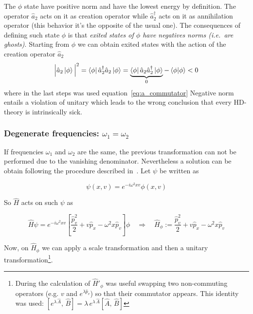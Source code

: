The $\phi$ state have positive norm and have the lowest energy by definition.
The operator $\hat{a}_2$ acts on it as creation operator while
$\hat{a}_2^{\dagger}$ acts on it as annihilation operator (this behavior it's
the opposite of the usual one). The consequences of defining such state $\phi$
is that \emph{exited states of $\phi$ have negatives norms (i.e.\ are ghosts)}.
Starting from $\phi$ we can obtain exited states with the action of the creation
operator $\hat{a}_2$
\begin{equation*}
  {\Big| \hat{a}_2 \ket{\phi} \Big|}^2 =
  \bra{\phi} \hat{a}_2^{\dagger} \hat{a}_2 \ket{\phi} =
  \underbrace{
    \bra{\phi} \hat{a}_2 \hat{a}_2^{\dagger} \ket{\phi}
  }_{0} - \bra{\phi} \ket{\phi} < 0
\end{equation*}
where in the last steps was used equation~\eqref{eq:a_commutator}
Negative norm entails a violation of unitary which
leads to the wrong conclusion that every HD-theory is intrinsically sick.

\subsubsection{Degenerate frequencies: $\omega_1 = \omega_2$}
If frequencies $\omega_1$ and $\omega_2$ are the same, the previous
transformation can not be performed due to the vanishing denominator.
Nevertheless a solution can be obtain following the procedure described
in~\cite{PU50, Bolonek06}. Let $\psi$ be written as

\begin{equation*}
  \psi(x, v) = e^{-i\omega^2xv}\phi(x,v)
\end{equation*}

So $\hat{H}$ acts on such $\psi$ as

\begin{equation*}
  \hat{H} \psi = e^{-i\omega^2xv}
  \left[\frac{\hat{p}_v^2}{2} + v\hat{p}_x - \omega^2x\hat{p}_v \right] \phi
  \quad \Rightarrow \quad
  \hat{H}_{\phi} :=
  \frac{\hat{p}_v^2}{2} + v\hat{p}_x - \omega^2x\hat{p}_v
\end{equation*}

Now, on $\hat{H}_{\phi}$ we can apply a scale transformation and then a unitary
transformation\footnote{
  During the calculation of $\hat{H}'_{\phi}$ was useful swapping
  two non-commuting operators (e.g. $v$ and $e^{\lambda \hat{p}_v}$)
  so that their commutator appears. This identity was used:
  $\left[e^{\lambda \, \hat{A}}, \, \hat{B}\right] =
  \lambda \, e^{\lambda \, \hat{A}} \left[\hat{A} , \, \hat{B} \right]$
}.

